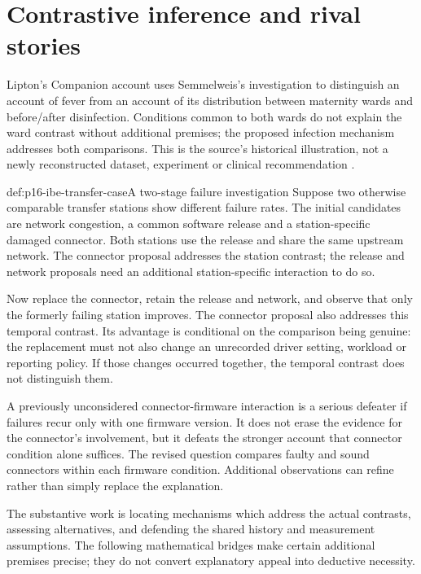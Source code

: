\section{Contrastive inference and rival stories}
\label{sec:p16-ibe-comparative-case}

Lipton's Companion account uses Semmelweis's investigation to distinguish
an account of fever from an account of its distribution between maternity
wards and before/after disinfection. Conditions common to both wards do
not explain the ward contrast without additional premises; the proposed
infection mechanism addresses both comparisons. This is the source's
historical illustration, not a newly reconstructed dataset, experiment
or clinical recommendation \cite[author copy p.~8]{Lipton2000IBECompanion}.

\begin{hbexample}{def:p16-ibe-transfer-case}{A two-stage failure investigation}
Suppose two otherwise comparable transfer stations show different failure
rates. The initial candidates are network congestion, a common software
release and a station-specific damaged connector. Both stations use the
release and share the same upstream network. The connector proposal
addresses the station contrast; the release and network proposals need
an additional station-specific interaction to do so.

Now replace the connector, retain the release and network, and observe
that only the formerly failing station improves. The connector proposal
also addresses this temporal contrast. Its advantage is conditional on
the comparison being genuine: the replacement must not also change an
unrecorded driver setting, workload or reporting policy. If those changes
occurred together, the temporal contrast does not distinguish them.

A previously unconsidered connector-firmware interaction is a serious
defeater if failures recur only with one firmware version. It does not
erase the evidence for the connector's involvement, but it defeats the
stronger account that connector condition alone suffices. The revised
question compares faulty and sound connectors within each firmware
condition. Additional observations can refine rather than simply replace
the explanation.
\end{hbexample}

The substantive work is locating mechanisms which address the actual
contrasts, assessing alternatives, and defending the shared history and
measurement assumptions. The following mathematical bridges make certain
additional premises precise; they do not convert explanatory appeal into
deductive necessity.

